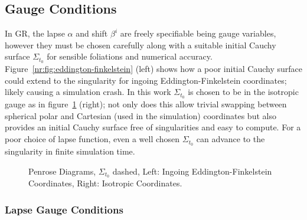 \subsection{Gauge Conditions}
In GR, the lapse $\alpha$ and shift $\beta^i$ are freely specifiable being gauge variables, however they must be chosen carefully along with a suitable initial Cauchy surface $\Sigma_{t_0}$ for sensible foliations and numerical accuracy. Figure~\ref{nr:fig:eddington-finkelstein} (left) shows how a poor initial Cauchy surface could extend to the singularity for ingoing Eddington-Finkelstein coordinates; likely causing a simulation crash. In this work $\Sigma_{t_0}$ is chosen to be in the isotropic gauge as in figure~\ref{nr:fig:isotropic} (right); not only does this allow trivial swapping between spherical polar and Cartesian (used in the simulation) coordinates but also provides an initial Cauchy surface free of singularities and easy to compute. For a poor choice of lapse function, even a well chosen $\Sigma_{t_0}$ can advance to the singularity in finite simulation time.
  \begin{figure}[h]
  \caption{Penrose Diagrams, $\Sigma_{t_0}$ dashed, Left: Ingoing Eddington-Finkelstein Coordinates, Right: Isotropic Coordinates.}
  \centering
   \label{nr:fig:eddington-finkelstein}
  \hfill
   \label{nr:fig:isotropic}
\end{figure}

\subsubsection{Lapse Gauge Conditions}

